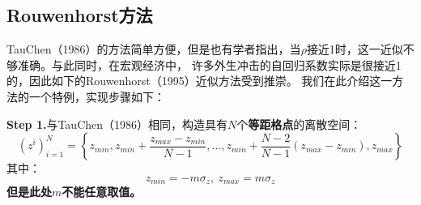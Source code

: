 \subsection{Rouwenhorst方法}

TauChen（1986）的方法简单方便，但是也有学者指出，当$\rho$接近1时，这一近似不够准确。与此同时，在宏观经济中，
许多外生冲击的自回归系数实际是很接近1的，因此如下的Rouwenhorst（1995）近似方法受到推崇。
我们在此介绍这一方法的一个特例，实现步骤如下：

\textbf{Step 1.}与TauChen（1986）相同，构造具有$N$个\textbf{等距格点}的离散空间：
\begin{equation*}
    \left(z^i\right)_{i=1}^N =
        \left\{z_{min }, z_{min }+\frac{z_{max }-z_{min }}{N-1}, \ldots, 
            z_{min }+\frac{N-2}{N-1}\left(z_{max }-z_{min }\right), z_{max }\right\}
\end{equation*}
其中：
\begin{equation*}
    z_{min} = -m\sigma_z,~z_{max} = m\sigma_z
\end{equation*}
\textbf{但是此处$m$不能任意取值。}

